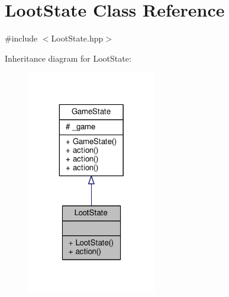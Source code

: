 \hypertarget{class_loot_state}{\section{Loot\-State Class Reference}
\label{class_loot_state}
}


{\ttfamily \#include $<$Loot\-State.\-hpp$>$}



Inheritance diagram for Loot\-State\-:\nopagebreak
\begin{figure}[H]
\begin{center}
\leavevmode
\includegraphics[width=160pt]{class_loot_state__inherit__graph}
\end{center}
\end{figure}


